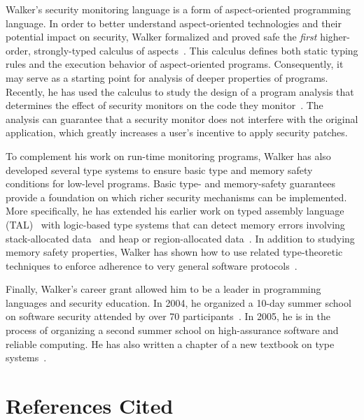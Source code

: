 \documentclass[11pt]{article}
\begin{document}
Walker's security monitoring language is a form of aspect-oriented programming language.
In order to better understand aspect-oriented technologies and their
potential impact on security, Walker formalized and proved
safe the {\em first} higher-order, strongly-typed calculus of 
aspects~\cite{walker+:aspects}.  This calculus defines
both static typing rules and the execution behavior of aspect-oriented
programs.  Consequently, it may
serve as a starting point for analysis of deeper properties of programs.
Recently, he has used the calculus to study the design of a
program analysis that determines the effect of security monitors on
the code they monitor~\cite{dantas+:harmless-advice}.   The analysis
can guarantee that a security monitor does not interfere with the 
original application, which greatly increases a user's incentive
to apply security patches.

To complement his work on run-time monitoring programs, Walker has also
developed several type systems to ensure basic type and memory safety conditions
for low-level programs.  Basic type- and memory-safety guarantees provide a foundation on which
richer security mechanisms can be implemented.  More specifically, he
has extended his earlier work on typed assembly language (TAL)~\cite{morrisett+:tal,morrisett+:journal-stal} with
logic-based type systems that can detect memory errors involving
stack-allocated data~\cite{ahmed+:stack} and heap or region-allocated
data~\cite{ahmed+:hierarchical-storage}.  In addition to studying memory safety
properties, Walker has shown how to use related type-theoretic techniques
to enforce adherence to very general software
protocols~\cite{mandelbaum+:refinements}.  

Finally, Walker's career grant allowed him to be a leader in
programming languages and security education. In 2004, he organized
a 10-day summer school on software security 
attended by over 70 participants~\cite{summerschool04}.  In 2005, he is in the process of
organizing a second summer school on high-assurance software and reliable computing.  He has also written a
chapter of a new textbook on type systems~\cite{walker:attapl}.



\newpage
\section{References Cited}
{
 \small
} \newpage
\end{document}
